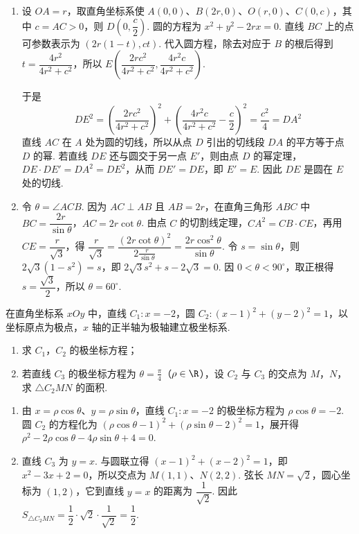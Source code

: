 \begin{solution}
\begin{enumerate}
\item 设 \(OA=r\)，取直角坐标系使 \(A(0,0)\)、\(B(2r,0)\)、\(O(r,0)\)、\(C(0,c)\)，其中 \(c=AC>0\)，则 \(D(0,\dfrac c2)\). 圆的方程为 \(x^2+y^2-2rx=0\). 直线 \(BC\) 上的点可参数表示为 \((2r(1-t),ct)\). 代入圆方程，除去对应于 \(B\) 的根后得到
\(t=\dfrac{4r^2}{4r^2+c^2}\)，所以
\(E\left(\dfrac{2rc^2}{4r^2+c^2},\dfrac{4r^2c}{4r^2+c^2}\right)\).

于是
\[
DE^2=\left(\frac{2rc^2}{4r^2+c^2}\right)^2+\left(\frac{4r^2c}{4r^2+c^2}-\frac c2\right)^2=\frac{c^2}{4}=DA^2
\]
直线 \(AC\) 在 \(A\) 处为圆的切线，所以从点 \(D\) 引出的切线段 \(DA\) 的平方等于点 \(D\) 的幂. 若直线 \(DE\) 还与圆交于另一点 \(E'\)，则由点 \(D\) 的幂定理，\(DE\cdot DE'=DA^2=DE^2\)，从而 \(DE'=DE\)，即 \(E'=E\). 因此 \(DE\) 是圆在 \(E\) 处的切线.
\item 令 \(\theta=\angle ACB\). 因为 \(AC\perp AB\) 且 \(AB=2r\)，在直角三角形 \(ABC\) 中
\(BC=\dfrac{2r}{\sin\theta}\)，\(AC=2r\cot\theta\). 由点 \(C\) 的切割线定理，\(CA^2=CB\cdot CE\)，再用 \(CE=\dfrac r{\sqrt3}\)，得
\(\dfrac r{\sqrt3}=\dfrac{(2r\cot\theta)^2}{2\frac{r}{\sin\theta}}=\dfrac{2r\cos^2\theta}{\sin\theta}\). 令 \(s=\sin\theta\)，则 \(2\sqrt3(1-s^2)=s\)，即 \(2\sqrt3s^2+s-2\sqrt3=0\). 因 \(0<\theta<90^{\circ}\)，取正根得 \(s=\dfrac{\sqrt3}{2}\)，所以 \(\theta=60^{\circ}\).
\end{enumerate}
\end{solution}

\begin{problem}
在直角坐标系 \(xOy\) 中，直线 \(C_1: x = -2\)，圆 \(C_2: (x - 1)^2 + (y - 2)^2 = 1\)，以坐标原点为极点，\(x\) 轴的正半轴为极轴建立极坐标系.

\begin{enumerate}
\item 求 \(C_1\)，\(C_2\) 的极坐标方程；
\item 若直线 \(C_3\) 的极坐标方程为 \(\theta = \frac{\pi}{4}\)（\(\rho \in \R\)），设 \(C_2\) 与 \(C_3\) 的交点为 \(M\)，\(N\)，求 \(\triangle C_2MN\) 的面积.
\end{enumerate}
\end{problem}

\begin{solution}
\begin{enumerate}
\item 由 \(x=\rho\cos\theta\)、\(y=\rho\sin\theta\)，直线 \(C_1:x=-2\) 的极坐标方程为 \(\rho\cos\theta=-2\). 圆 \(C_2\) 的方程化为
\((\rho\cos\theta-1)^2+(\rho\sin\theta-2)^2=1\)，展开得 \(\rho^2-2\rho\cos\theta-4\rho\sin\theta+4=0\).
	\item 直线 \(C_3\) 为 \(y=x\). 与圆联立得
	\((x-1)^2+(x-2)^2=1\)，即 \(x^2-3x+2=0\)，所以交点为 \(M(1,1)\)、\(N(2,2)\). 弦长 \(MN=\sqrt2\)，圆心坐标为 \((1,2)\)，它到直线 \(y=x\) 的距离为 \(\dfrac1{\sqrt2}\). 因此
\(S_{\triangle C_2MN}=\dfrac12\cdot\sqrt2\cdot\dfrac1{\sqrt2}=\dfrac12\).
\end{enumerate}
\end{solution}

